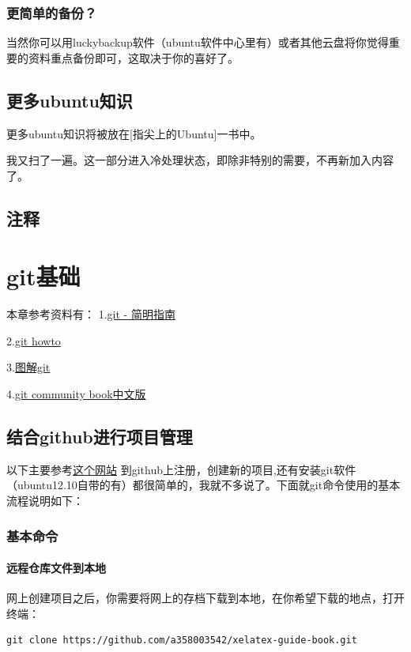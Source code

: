 \documentclass[11pt,oneside]{book}
\begin{document}
\subsection{更简单的备份？}
当然你可以用luckybackup软件（ubuntu软件中心里有）或者其他云盘将你觉得重要的资料重点备份即可，这取决于你的喜好了。

\section{更多ubuntu知识}
更多ubuntu知识将被放在[指尖上的Ubuntu]一书中。

我又扫了一遍。这一部分进入冷处理状态，即除非特别的需要，不再新加入内容了。


\section{注释}
\showendnotes


\chapter{git基础}
本章参考资料有：
1.\href{http://rogerdudler.github.io/git-guide/index.zh.html}{git - 简明指南}

2.\href{http://githowto.com/}{git howto}

3.\href{http://marklodato.github.io/visual-git-guide/index-zh-cn.html}{图解git}

4.\href{http://gitbook.liuhui998.com/}{git community book中文版}


\section{结合github进行项目管理}
以下主要参考\href{http://rogerdudler.github.io/git-guide/index.zh.html}{这个网站}
到github上注册，创建新的项目,还有安装git软件（ubuntu12.10自带的有）都很简单的，我就不多说了。下面就git命令使用的基本流程说明如下：
\subsection{基本命令}
\subsubsection{远程仓库文件到本地}
网上创建项目之后，你需要将网上的存档下载到本地，在你希望下载的地点，打开终端：
\begin{Verbatim}
git clone https://github.com/a358003542/xelatex-guide-book.git
\end{Verbatim}
\end{document}
